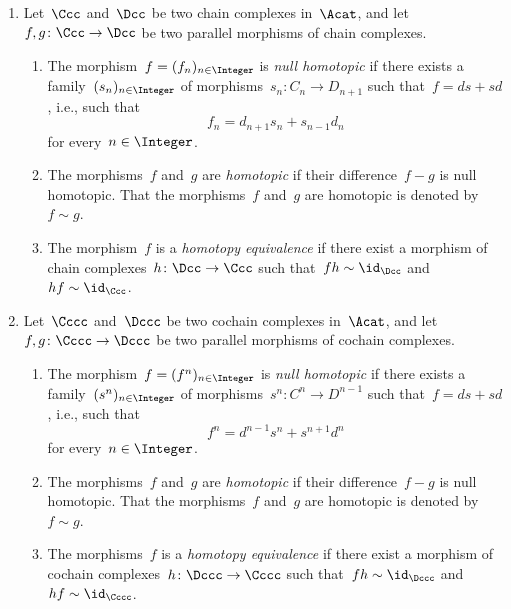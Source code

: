 \begin{definition}
  \leavevmode
  \begin{enumerate}
    \item 
      Let~$\Ccc$ and~$\Dcc$ be two chain complexes in~$\Acat$, and let~$f, g \colon \Ccc \to \Dcc$ be two parallel morphisms of chain complexes.
      \begin{enumerate}
        \item
          The morphism~$f = (f_n)_{n \in \Integer}$ is \emph{null homotopic} if there exists a family~$(s_n)_{n \in \Integer}$ of morphisms~$s_n \colon C_n \to D_{n+1}$ such that~$f = ds + sd$, i.e., such that
          \[
                f_n
            =  d_{n+1} s_n + s_{n-1} d_n
          \]
            for every~$n \in \Integer$.
        \item
          The morphisms~$f$ and~$g$ are \emph{homotopic} if their difference~$f - g$ is null homotopic.
          That the morphisms~$f$ and~$g$ are homotopic is denoted by~$f \sim g$.
        \item
          The morphism~$f$ is a \emph{homotopy equivalence} if there exist a morphism of chain complexes~$h \colon \Dcc \to \Ccc$ such that~$f h \sim \id_{\Dcc}$ and~$h f \sim \id_{\Ccc}$.
      \end{enumerate}
    \item
      Let~$\Cccc$ and~$\Dccc$ be two cochain complexes in~$\Acat$, and let~$f, g \colon \Cccc \to \Dccc$ be two parallel morphisms of cochain complexes.
      \begin{enumerate}
        \item
          The morphism~$f = (f^n)_{n \in \Integer}$ is \emph{null homotopic} if there exists a family~$(s^n)_{n \in \Integer}$ of morphisms~$s^n \colon C^n \to D^{n-1}$ such that~$f = ds + sd$, i.e., such that
          \[
              f^n
            = d^{n-1} s^n + s^{n+1} d^n
          \]
          for every~$n \in \Integer$.
        \item
          The morphisms~$f$ and~$g$ are \emph{homotopic} if their difference~$f - g$ is null homotopic.
          That the morphisms~$f$ and~$g$ are homotopic is denoted by~$f \sim g$.
        \item
          The morphisms~$f$ is a \emph{homotopy equivalence} if there exist a morphism of cochain complexes~$h \colon \Dccc \to \Cccc$ such that~$f h \sim \id_{\Dccc}$ and~$h f \sim \id_{\Cccc}$.
      \end{enumerate}
  \end{enumerate}
\end{definition}


